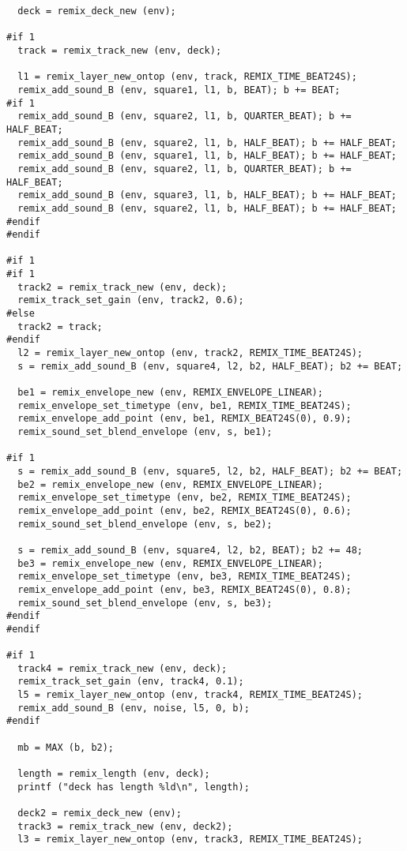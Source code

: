 \begin{verbatim}
  deck = remix_deck_new (env);

#if 1
  track = remix_track_new (env, deck);

  l1 = remix_layer_new_ontop (env, track, REMIX_TIME_BEAT24S);
  remix_add_sound_B (env, square1, l1, b, BEAT); b += BEAT;
#if 1
  remix_add_sound_B (env, square2, l1, b, QUARTER_BEAT); b += HALF_BEAT;
  remix_add_sound_B (env, square2, l1, b, HALF_BEAT); b += HALF_BEAT;
  remix_add_sound_B (env, square1, l1, b, HALF_BEAT); b += HALF_BEAT;
  remix_add_sound_B (env, square2, l1, b, QUARTER_BEAT); b += HALF_BEAT;
  remix_add_sound_B (env, square3, l1, b, HALF_BEAT); b += HALF_BEAT;
  remix_add_sound_B (env, square2, l1, b, HALF_BEAT); b += HALF_BEAT;
#endif
#endif

#if 1
#if 1
  track2 = remix_track_new (env, deck);
  remix_track_set_gain (env, track2, 0.6);
#else
  track2 = track;
#endif
  l2 = remix_layer_new_ontop (env, track2, REMIX_TIME_BEAT24S);
  s = remix_add_sound_B (env, square4, l2, b2, HALF_BEAT); b2 += BEAT;

  be1 = remix_envelope_new (env, REMIX_ENVELOPE_LINEAR);
  remix_envelope_set_timetype (env, be1, REMIX_TIME_BEAT24S);
  remix_envelope_add_point (env, be1, REMIX_BEAT24S(0), 0.9);
  remix_sound_set_blend_envelope (env, s, be1);

#if 1
  s = remix_add_sound_B (env, square5, l2, b2, HALF_BEAT); b2 += BEAT;
  be2 = remix_envelope_new (env, REMIX_ENVELOPE_LINEAR);
  remix_envelope_set_timetype (env, be2, REMIX_TIME_BEAT24S);
  remix_envelope_add_point (env, be2, REMIX_BEAT24S(0), 0.6);
  remix_sound_set_blend_envelope (env, s, be2);

  s = remix_add_sound_B (env, square4, l2, b2, BEAT); b2 += 48;
  be3 = remix_envelope_new (env, REMIX_ENVELOPE_LINEAR);
  remix_envelope_set_timetype (env, be3, REMIX_TIME_BEAT24S);
  remix_envelope_add_point (env, be3, REMIX_BEAT24S(0), 0.8);
  remix_sound_set_blend_envelope (env, s, be3);
#endif
#endif

#if 1
  track4 = remix_track_new (env, deck);
  remix_track_set_gain (env, track4, 0.1);
  l5 = remix_layer_new_ontop (env, track4, REMIX_TIME_BEAT24S);
  remix_add_sound_B (env, noise, l5, 0, b);
#endif

  mb = MAX (b, b2);

  length = remix_length (env, deck);
  printf ("deck has length %ld\n", length);

  deck2 = remix_deck_new (env);
  track3 = remix_track_new (env, deck2);
  l3 = remix_layer_new_ontop (env, track3, REMIX_TIME_BEAT24S);


\end{verbatim}
